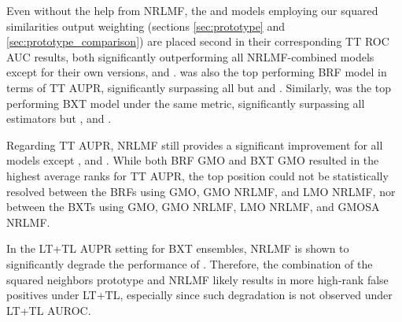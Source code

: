 Even without the help from NRLMF, the  and  models employing our squared similarities output weighting (sections \autoref{sec:prototype} and \autoref{sec:prototype_comparison}) are placed second in their corresponding TT ROC AUC results, both significantly outperforming all NRLMF-combined models except for their own versions,  and . %
 was also the top performing BRF model in terms of TT AUPR, significantly surpassing all but  and .
Similarly,  was the top performing BXT model under the same metric, significantly surpassing all estimators but ,  and .

Regarding TT AUPR, NRLMF still provides a significant improvement for all models except ,  and . While both BRF GMO and BXT GMO resulted in the highest average ranks for TT AUPR, the top position could not be statistically resolved between the BRFs using GMO, GMO NRLMF, and LMO NRLMF, nor between the BXTs using GMO, GMO NRLMF, LMO NRLMF, and GMOSA NRLMF.

In the LT+TL AUPR setting for BXT ensembles, NRLMF is shown to significantly degrade the performance of . Therefore, the combination of the squared neighbors prototype and NRLMF likely results in more high-rank false positives under LT+TL, especially since such degradation is not observed under LT+TL AUROC.  %
%

